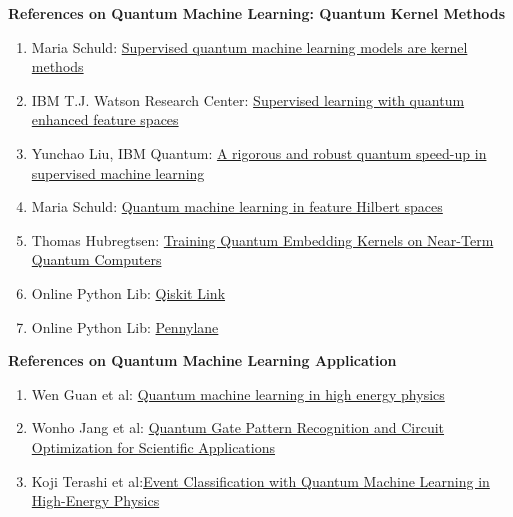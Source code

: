 \documentclass{article}
\begin{document}
\textbf{References on Quantum Machine Learning: Quantum Kernel Methods}
\begin{enumerate}
  \item Maria Schuld: \href{https://arxiv.org/abs/2101.11020}{Supervised quantum machine learning models are kernel methods}
  \item IBM T.J. Watson Research Center: \href{https://arxiv.org/abs/1804.11326}{Supervised learning with quantum enhanced feature spaces}
  \item Yunchao Liu, IBM Quantum: \href{https://arxiv.org/abs/2010.02174}{A rigorous and robust quantum speed-up in supervised machine learning}
  \item Maria Schuld: \href{https://arxiv.org/abs/1803.07128}{Quantum machine learning in feature Hilbert spaces}
  \item Thomas Hubregtsen: \href{https://arxiv.org/abs/2105.02276}{Training Quantum Embedding Kernels on Near-Term Quantum Computers}
  \item Online Python Lib: \href{https://qiskit.org/documentation/machine-learning/tutorials/03_quantum_kernel.html
  }{Qiskit Link}
  \item Online Python Lib: \href{https://pennylane.ai/qml/demos/tutorial_kernel_based_training.html}{Pennylane}
\end{enumerate}

\textbf{References on Quantum Machine Learning Application}
\begin{enumerate}
  \item Wen Guan et al: \href{https://iopscience.iop.org/article/10.1088/2632-2153/abc17d}{
    Quantum machine learning in high energy physics}
  \item Wonho Jang et al: \href{https://arxiv.org/abs/2102.10008}{
    Quantum Gate Pattern Recognition and Circuit Optimization for Scientific Applications}
  \item Koji Terashi et al:\href{https://link.springer.com/article/10.1007/s41781-020-00047-7}{Event Classification 
  with Quantum Machine Learning in High-Energy Physics }
\end{enumerate}
\end{document}

